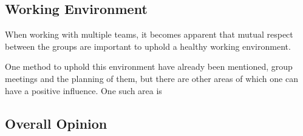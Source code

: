 \subsection{Working Environment}
When working with multiple teams, it becomes apparent that mutual respect between the groups are important to uphold a healthy working environment.

One method to uphold this environment have already been mentioned, group meetings and the planning of them, but there are other areas of which one can have a positive influence. One such area is


\subsection{Overall Opinion}
